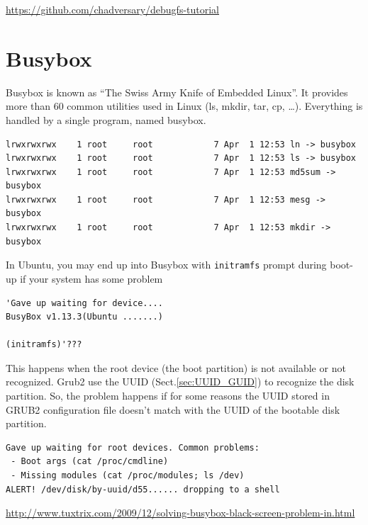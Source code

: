 \url{https://github.com/chadversary/debugfs-tutorial}


	
\section{Busybox}
\label{sec:busybox}

Busybox is known as ``The Swiss Army Knife of Embedded Linux''. It provides more
than 60 common utilities used in Linux (ls, mkdir, tar, cp, \ldots). Everything
is handled by a single program, named busybox.

\begin{verbatim}
lrwxrwxrwx    1 root     root            7 Apr  1 12:53 ln -> busybox
lrwxrwxrwx    1 root     root            7 Apr  1 12:53 ls -> busybox
lrwxrwxrwx    1 root     root            7 Apr  1 12:53 md5sum -> busybox
lrwxrwxrwx    1 root     root            7 Apr  1 12:53 mesg -> busybox
lrwxrwxrwx    1 root     root            7 Apr  1 12:53 mkdir -> busybox
\end{verbatim}

In Ubuntu, you may end up into Busybox with \verb!initramfs! prompt during
boot-up if your system has some problem
\begin{verbatim}
'Gave up waiting for device....
BusyBox v1.13.3(Ubuntu .......)

(initramfs)'???
\end{verbatim}
This happens when the root device (the boot partition) is not available or not
recognized. Grub2 use the UUID (Sect.\ref{sec:UUID_GUID}) to recognize the
disk partition. So, the problem happens if for some reasons the UUID stored in
GRUB2 configuration file doesn't match with the UUID of the bootable disk
partition.

\begin{verbatim}
Gave up waiting for root devices. Common problems:
 - Boot args (cat /proc/cmdline)
 - Missing modules (cat /proc/modules; ls /dev)
ALERT! /dev/disk/by-uuid/d55...... dropping to a shell

\end{verbatim}
\url{http://www.tuxtrix.com/2009/12/solving-busybox-black-screen-problem-in.html}

